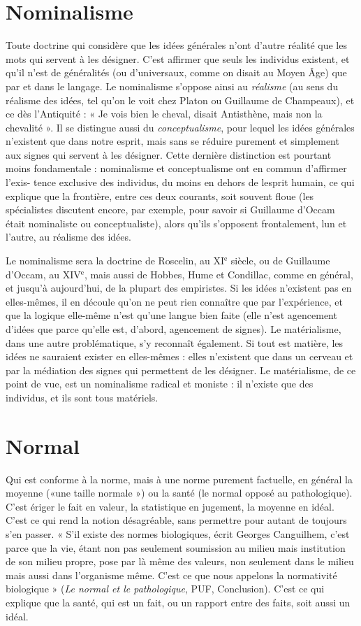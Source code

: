 \section{Nominalisme}
Toute doctrine qui considère que les idées générales n’ont
d’autre réalité que les mots qui servent à les désigner.
C’est affirmer que seuls les individus existent, et qu’il n’est de généralités (ou
d’universaux, comme on disait au Moyen Âge) que par et dans le langage. Le
nominalisme s'oppose ainsi au {\it réalisme} (au sens du réalisme des idées, tel qu’on
le voit chez Platon ou Guillaume de Champeaux), et ce dès l’Antiquité : « Je
vois bien le cheval, disait Antisthène, mais non la chevalité ». Il se distingue
aussi du {\it conceptualisme}, pour lequel les idées générales n'existent que dans
notre esprit, mais sans se réduire purement et simplement aux signes qui servent
à les désigner. Cette dernière distinction est pourtant moins fondamentale :
nominalisme et conceptualisme ont en commun d’affirmer l’exis-
tence exclusive des individus, du moins en dehors de lesprit humain, ce qui
explique que la frontière, entre ces deux courants, soit souvent floue (les spécialistes
discutent encore, par exemple, pour savoir si Guillaume d’Occam était
nominaliste ou conceptualiste), alors qu’ils s'opposent frontalement, lun et
l’autre, au réalisme des idées.

Le nominalisme sera la doctrine de Roscelin, au {\footnotesize XI$^\text{e}$} siècle, ou de
Guillaume d’Occam, au {\footnotesize XIV$^\text{e}$}, mais aussi de Hobbes, Hume et Condillac,
comme en général, et jusqu’à aujourd’hui, de la plupart des empiristes. Si les
idées n'existent pas en elles-mêmes, il en découle qu'on ne peut rien
connaître que par l'expérience, et que la logique elle-même n’est qu’une
langue bien faite (elle n’est agencement d’idées que parce qu’elle est, d’abord,
agencement de signes). Le matérialisme, dans une autre problématique, s’y
reconnaît également. Si tout est matière, les idées ne sauraient exister en elles-mêmes :
elles n’existent que dans un cerveau et par la médiation des signes
qui permettent de les désigner. Le matérialisme, de ce point de vue, est un
nominalisme radical et moniste : il n’existe que des individus, et ils sont tous
matériels.

\section{Normal}
Qui est conforme à la norme, mais à une norme purement factuelle,
en général la moyenne («une taille normale ») ou la
santé (le normal opposé au pathologique). C’est ériger le fait en valeur, la statistique
en jugement, la moyenne en idéal. C’est ce qui rend la notion désagréable,
sans permettre pour autant de toujours s’en passer. « S’il existe des
normes biologiques, écrit Georges Canguilhem, c’est parce que la vie, étant
non pas seulement soumission au milieu mais institution de son milieu
propre, pose par là même des valeurs, non seulement dans le milieu mais
aussi dans l'organisme même. C’est ce que nous appelons la normativité
biologique » ({\it Le normal et le pathologique}, PUF, Conclusion). C'est ce qui
explique que la santé, qui est un fait, ou un rapport entre des faits, soit aussi
un idéal.

